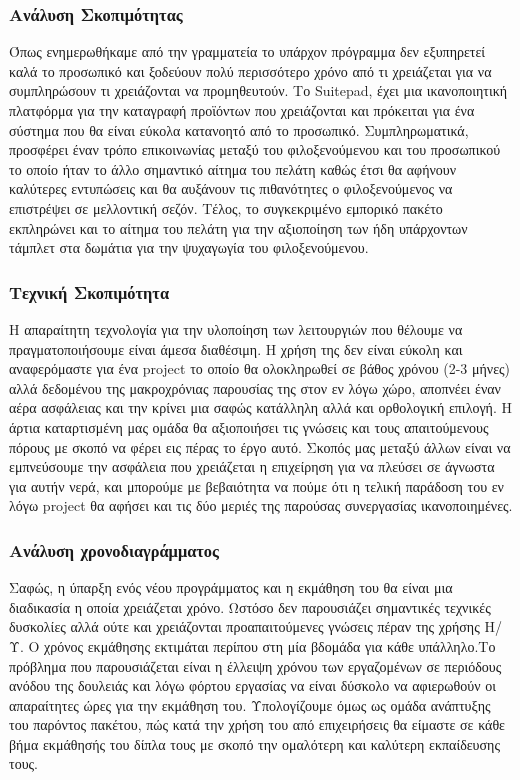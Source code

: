 \subsubsection{Ανάλυση Σκοπιμότητας}
Όπως ενημερωθήκαμε από την γραμματεία το υπάρχον πρόγραμμα δεν εξυπηρετεί καλά το 
προσωπικό και ξοδεύουν πολύ περισσότερο χρόνο από τι χρειάζεται για να συμπληρώσουν 
τι χρειάζονται να προμηθευτούν. Το Suitepad, έχει μια ικανοποιητική πλατφόρμα για την 
καταγραφή προϊόντων που χρειάζονται και πρόκειται για ένα σύστημα που θα είναι εύκολα 
κατανοητό από το προσωπικό. Συμπληρωματικά, προσφέρει έναν τρόπο επικοινωνίας 
μεταξύ του φιλοξενούμενου και του προσωπικού το οποίο ήταν το άλλο σημαντικό αίτημα 
του πελάτη καθώς έτσι θα αφήνουν καλύτερες εντυπώσεις και θα αυξάνουν τις πιθανότητες 
ο φιλοξενούμενος να επιστρέψει σε μελλοντική σεζόν. Τέλος, το συγκεκριμένο εμπορικό 
πακέτο εκπληρώνει και το αίτημα του πελάτη για την αξιοποίηση των ήδη υπάρχοντων 
τάμπλετ στα δωμάτια για την ψυχαγωγία του φιλοξενούμενου. \\

\subsubsection{Τεχνική Σκοπιμότητα}
Η απαραίτητη τεχνολογία για την υλοποίηση των λειτουργιών που θέλουμε να 
πραγματοποιήσουμε είναι άμεσα διαθέσιμη. Η χρήση της δεν είναι εύκολη και 
αναφερόμαστε για ένα  project το οποίο θα ολοκληρωθεί σε βάθος χρόνου (2-3 μήνες)
αλλά δεδομένου της μακροχρόνιας παρουσίας της στον εν λόγω χώρο, αποπνέει έναν αέρα 
ασφάλειας και την κρίνει μια σαφώς κατάλληλη αλλά και ορθολογική επιλογή. Η άρτια 
καταρτισμένη μας ομάδα θα αξιοποιήσει τις γνώσεις και τους απαιτούμενους πόρους με 
σκοπό να φέρει εις πέρας το έργο αυτό. Σκοπός μας μεταξύ άλλων είναι να εμπνεύσουμε την 
ασφάλεια που χρειάζεται η επιχείρηση για να πλεύσει σε άγνωστα για αυτήν νερά, και 
μπορούμε με βεβαιότητα να πούμε ότι η τελική παράδοση του εν λόγω project θα αφήσει 
και τις δύο μεριές της παρούσας συνεργασίας ικανοποιημένες. \\

\subsubsection{Ανάλυση χρονοδιαγράμματος}
Σαφώς, η ύπαρξη ενός νέου προγράμματος και η εκμάθηση του θα είναι μια διαδικασία η 
οποία χρειάζεται χρόνο. Ωστόσο δεν παρουσιάζει σημαντικές τεχνικές δυσκολίες αλλά 
ούτε και χρειάζονται προαπαιτούμενες γνώσεις πέραν της χρήσης Η/Υ. Ο χρόνος 
εκμάθησης εκτιμάται περίπου στη μία βδομάδα για κάθε υπάλληλο.Το πρόβλημα που 
παρουσιάζεται είναι η έλλειψη χρόνου των εργαζομένων σε περιόδους ανόδου της 
δουλειάς και λόγω φόρτου εργασίας να είναι δύσκολο να αφιερωθούν οι απαραίτητες 
ώρες για την εκμάθηση του. Υπολογίζουμε όμως ως ομάδα ανάπτυξης του παρόντος 
πακέτου, πώς κατά την χρήση του από επιχειρήσεις θα είμαστε σε κάθε βήμα εκμάθησής 
του δίπλα τους με σκοπό την ομαλότερη και καλύτερη εκπαίδευσης τους.  
\clearpage  

